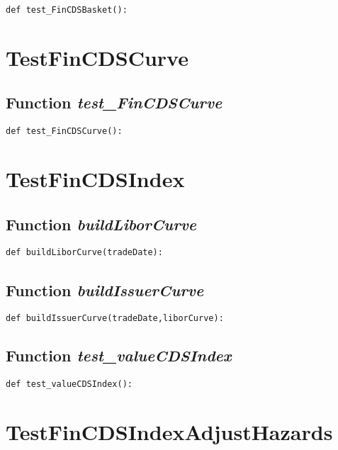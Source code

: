 \documentclass[twoside,11pt]{book}
\begin{document}
\begin{lstlisting}
def test_FinCDSBasket():
\end{lstlisting}


\newpage
\section{TestFinCDSCurve}

\subsection{Function {\it test\_FinCDSCurve}}


\begin{lstlisting}
def test_FinCDSCurve():
\end{lstlisting}


\newpage
\section{TestFinCDSIndex}

\subsection{Function {\it buildLiborCurve}}


\begin{lstlisting}
def buildLiborCurve(tradeDate):
\end{lstlisting}

\subsection{Function {\it buildIssuerCurve}}


\begin{lstlisting}
def buildIssuerCurve(tradeDate,liborCurve):
\end{lstlisting}

\subsection{Function {\it test\_valueCDSIndex}}


\begin{lstlisting}
def test_valueCDSIndex():
\end{lstlisting}


\newpage
\section{TestFinCDSIndexAdjustHazards}
\end{document}
